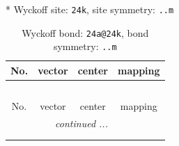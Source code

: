 \documentclass[fleqn,8pt]{jsarticle}
\begin{document}
* Wyckoff site: {\tt 24k}, site symmetry: {\tt ..m}
\renewcommand{\arraystretch}{1.2}
\begin{longtable}{cccc}
\caption{Wyckoff bond: {\tt 24a@24k}, bond symmetry: {\tt ..m}}
 \\
 \hline \hline
No. & vector & center & mapping \\ \hline \endfirsthead

\multicolumn{3}{l}{\tablename\ \thetable{}} \\
 \hline \hline
No. & vector & center & mapping \\ \hline \endhead

 \hline \hline
\multicolumn{3}{r}{\footnotesize\it continued ...} \\ \endfoot

 \hline \hline
\multicolumn{3}{r}{} \\ \endlastfoot


\end{longtable}
\end{document}
